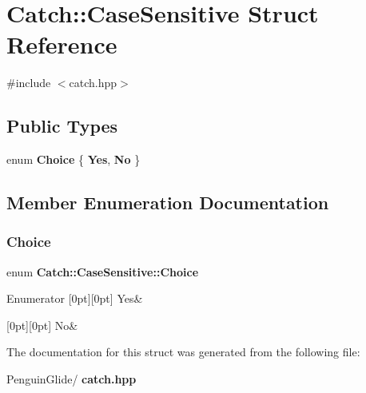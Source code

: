 \section{Catch\+::Case\+Sensitive Struct Reference}
\label{struct_catch_1_1_case_sensitive}


{\ttfamily \#include $<$catch.\+hpp$>$}

\subsection*{Public Types}
\begin{DoxyCompactItemize}
\item 
enum \textbf{ Choice} \{ \textbf{ Yes}, 
\textbf{ No}
 \}
\end{DoxyCompactItemize}


\subsection{Member Enumeration Documentation}
\mbox{\label{struct_catch_1_1_case_sensitive_aad49d3aee2d97066642fffa919685c6a}} 
\subsubsection{Choice}
{\footnotesize\ttfamily enum \textbf{ Catch\+::\+Case\+Sensitive\+::\+Choice}}

\begin{DoxyEnumFields}{Enumerator}
[0pt][0pt]{}\mbox{\label{struct_catch_1_1_case_sensitive_aad49d3aee2d97066642fffa919685c6aa7c5550b69ec3c502e6f609b67f9613c6}} 
Yes&\\
\hline

[0pt][0pt]{}\mbox{\label{struct_catch_1_1_case_sensitive_aad49d3aee2d97066642fffa919685c6aa4ffff8d29b481f0116abc37228cd53f6}} 
No&\\
\hline

\end{DoxyEnumFields}


The documentation for this struct was generated from the following file\+:\begin{DoxyCompactItemize}
\item 
Penguin\+Glide/\textbf{ catch.\+hpp}\end{DoxyCompactItemize}
